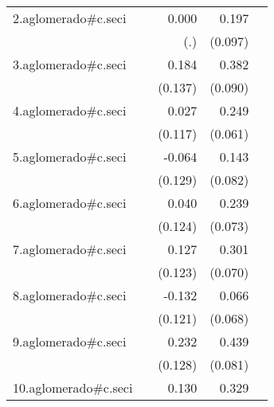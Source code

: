 {\begin{longtable}{l*{4}{D{.}{.}{-1}}}
\addlinespace
2.aglomerado#c.seci&                     &       0.000         &       0.197\sym{*}  &                     \\
            &                     &         (.)         &     (0.097)         &                     \\
\addlinespace
3.aglomerado#c.seci&                     &       0.184         &       0.382\sym{***}&                     \\
            &                     &     (0.137)         &     (0.090)         &                     \\
\addlinespace
4.aglomerado#c.seci&                     &       0.027         &       0.249\sym{***}&                     \\
            &                     &     (0.117)         &     (0.061)         &                     \\
\addlinespace
5.aglomerado#c.seci&                     &      -0.064         &       0.143         &                     \\
            &                     &     (0.129)         &     (0.082)         &                     \\
\addlinespace
6.aglomerado#c.seci&                     &       0.040         &       0.239\sym{**} &                     \\
            &                     &     (0.124)         &     (0.073)         &                     \\
\addlinespace
7.aglomerado#c.seci&                     &       0.127         &       0.301\sym{***}&                     \\
            &                     &     (0.123)         &     (0.070)         &                     \\
\addlinespace
8.aglomerado#c.seci&                     &      -0.132         &       0.066         &                     \\
            &                     &     (0.121)         &     (0.068)         &                     \\
\addlinespace
9.aglomerado#c.seci&                     &       0.232         &       0.439\sym{***}&                     \\
            &                     &     (0.128)         &     (0.081)         &                     \\
\addlinespace
10.aglomerado#c.seci&                     &       0.130         &       0.329\sym{***}&                     \\

\end{longtable}}
